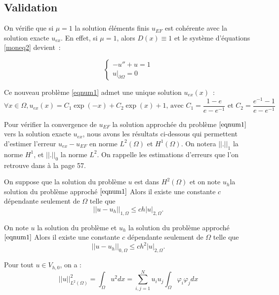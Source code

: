 \documentclass[12pt]{article}
\begin{document}
\subsection{Validation}
On vérifie que si $\mu = 1 $ la solution éléments finis $u_{EF}$ est cohérente avec la solution exacte $u_{ex}$. En effet, si $\mu = 1 $, alors $D(x) \equiv 1 $ et le système d'équations \eqref{moneq2} devient :

\begin{equation}\label{eqnum1}
\begin{cases}
-u'' + u = 1 \\
u|_{\partial \Omega} = 0
\end{cases}
\end{equation}



Ce nouveau problème \eqref{eqnum1} admet une unique solution $u_{ex}(x)$ :
$$
\forall x \in \Omega, u_{ex}(x) = C_{1}\exp(-x) + C_{2}\exp(x) +1 \text{, avec } C_{1} = \frac{1-e}{e - e^{-1}} \text{ et } C_{2} = \frac{e^{-1} - 1}{e - e^{-1}} $$

Pour vérifier la convergence de $u_{EF}$ la solution approchée du problème $\eqref{eqnum1}$ vers la solution exacte $u_{ex}$, nous avons les résultats ci-dessous qui permettent d’estimer l’erreur $u_{ex} - u_{EF}$ en norme $L^{2}(\Omega)$ et $H^{1}(\Omega)$. On notera $||.||_1$ la norme $H^{1}$, et $||.||_0$ la norme $L^{2}$. On rappelle les estimations d'erreurs que l'on retrouve dans \cite{Bopeng RAO} à la page 57.

\begin{Proposition}
On suppose que la solution du problème $u$ est dans $H^{2}(\Omega)$
et on note $u_{h}$la solution du problème approché $\eqref{eqnum1}$ 
 Alors il existe une constante $c$ dépendante seulement de $\Omega$ telle que
 $$
 ||u-u_{h}||_{1,\Omega} \leq ch|u|_{2,\Omega}.
 $$
\end{Proposition}

\begin{Proposition}
On note $u$ la solution du problème et $u_{h}$ la solution du problème approché $\eqref{eqnum1}$ Alors il existe une constante $c$ dépendante seulement de $\Omega$ telle que
 $$
 ||u-u_{h}||_{0,\Omega} \leq ch^{2}|u|_{2,\Omega}.
 $$
\end{Proposition}




\noindent Pour tout $u \in V_{h,0}$, on a :
$$
|| u||_{L^{2}(\Omega)}^{2} = \int_{\Omega} u^2 dx = \sum_{i, j = 1}^{N} u_i u_j\int_{\Omega} \varphi_i\varphi_j dx 
$$
\end{document}
